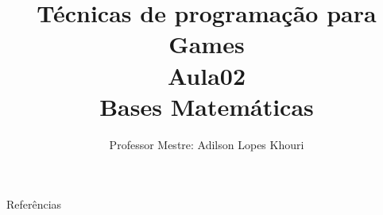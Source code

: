 \documentclass[compress, hyperref={pdfpagelayout=SinglePage}]{beamer}
\title[AED - Aula 02]{Técnicas de programação para Games \\ Aula02 \\ Bases Matemáticas}
\author{Professor Mestre: Adilson Lopes Khouri}
\begin{document}
	\begin{frame}
		\titlepage
	\end{frame}

	
	
	
	

	
	
	
			
	

	


	\begin{frame}{}
		\begin{block}{Referências}
			\nocite{*}
			
	    		
		\end{block}
	\end{frame}
\end{document}
